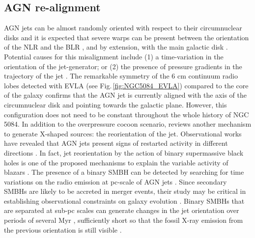 \documentclass[modern]{CORE-AAS/aastex631}
\begin{document}
\subsection{AGN re-alignment}
\label{subsec:discussion_realignment}
AGN jets can be almost randomly oriented with respect to their circumnuclear disks \citep{schmitt+2002apj575_150}  and it is expected that severe warps can be present between the orientation of the NLR and the BLR \citep{lawrence+2010apj714_561}, and by extension, with the main galactic disk \citep{clarke+1998apj495_189, nagar+1999apj516_97, kinney+2000apj537_152}. Potential causes for this misalignment include (1) a time-variation in the orientation of the jet-generator; or (2) the presence of pressure gradients in the trajectory of the jet \citep{gallimore+2006aj132_546}. The remarkable symmetry of the 6 cm continuum radio lobes detected with EVLA (see Fig.\,\ref{fig:NGC5084_EVLA}) compared to the core of the galaxy confirms that the AGN jet is currently aligned with the axis of the circumnuclear disk and pointing towards the galactic plane. However, this configuration does not need to be constant throughout the whole history of NGC\,5084. 
In addition to the overpressure cocoon scenario, \citet{giri+2024sci11_1371101} reviews another mechanism to generate X-shaped sources: the reorientation of the jet. Observational works have revealed that AGN jets present signs of restarted activity in different directions  \citep{saripalli+2013mnras436_690, nandi+2021apj908_178}. In fact, jet reorientation by the action of binary supermassive black holes is one of the proposed mechanisms to explain the variable activity of blazars \citep{britzen+2018mnras478_3199}. The presence of a binary SMBH can be detected by searching for time variations on the radio emission at pc-scale of AGN jets \citep{jiang+2023apj959_11}. Since secondary SMBHs are likely to be accreted in merger events, their study may be critical in establishing observational constraints on galaxy evolution \citep{yu2002mnras331_935}. Binary SMBHs that are separated at sub-pc scales can generate changes in the jet orientation over periods of several Myr \citep{giri+2024sci11_1371101}, sufficiently short so that the fossil X-ray emission from the previous orientation is still visible \citep[$\sim10-20$ Myr]{zubovas+2022mnras515_1705}. 
\end{document}
